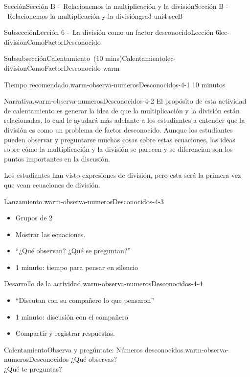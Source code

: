 \documentclass[oneside,10pt,]{article}
\begin{document}
\begin{sectionptx}{Sección}{Sección B -~Relacionemos la multiplicación y la división}{}{Sección B -~Relacionemos la multiplicación y la división}{}{}{gra3-uni4-secB}
\begin{subsectionptx}{Subsección}{Lección 6 -~La división como un factor desconocido}{}{Lección 6}{}{}{lec-divisionComoFactorDesconocido}
%
\begin{subsubsectionptx}{Subsubsección}{Calentamiento~(10 mins)}{}{Calentamiento}{}{}{lec-divisionComoFactorDesconocido-warm}
\par
\begin{paragraphs}{Tiempo recomendado.}{warm-observa-numerosDesconocidos-4-1}%
10 minutos%
\end{paragraphs}%
\begin{paragraphs}{Narrativa.}{warm-observa-numerosDesconocidos-4-2}%
El propósito de esta actividad de calentamiento es generar la idea de que la multiplicación y la división están relacionadas, lo cual le ayudará más adelante a los estudiantes a entender que la división es como un problema de factor desconocido. Aunque los estudiantes pueden observar y preguntarse muchas cosas sobre estas ecuaciones, las ideas sobre cómo la multiplicación y la división se parecen y se diferencian son los puntos importantes en la discusión.%
\par
Los estudiantes han visto expresiones de división, pero esta será la primera vez que vean ecuaciones de división.%
\end{paragraphs}%
\begin{paragraphs}{Lanzamiento.}{warm-observa-numerosDesconocidos-4-3}%
%
\begin{itemize}[label=\textbullet]
\item{}Grupos de 2%
\item{}Mostrar las ecuaciones.%
\item{}``¿Qué observan? ¿Qué se preguntan?''%
\item{}1 minuto: tiempo para pensar en silencio%
\end{itemize}
\end{paragraphs}%
\begin{paragraphs}{Desarrollo de la actividad.}{warm-observa-numerosDesconocidos-4-4}%
%
\begin{itemize}[label=\textbullet]
\item{}``Discutan con su compañero lo que pensaron''%
\item{}1 minuto: discusión con el compañero%
\item{}Compartir y registrar respuestas.%
\end{itemize}
\end{paragraphs}%
\begin{exploration}{Calentamiento}{Observa y pregúntate: Números desconocidos.}{warm-observa-numerosDesconocidos}%
¿Qué observas?\\
 ¿Qué te preguntas?%

\end{exploration}
\end{subsubsectionptx}
\end{subsectionptx}
\end{sectionptx}
\end{document}
